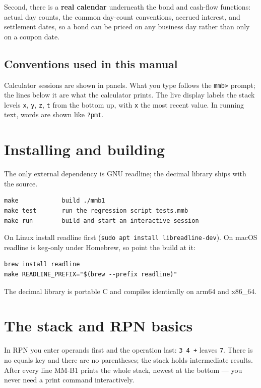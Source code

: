 \documentclass[11pt]{article}
\newcommand{\w}[1]{\texttt{#1}}
\begin{document}
Second, there is a \textbf{real calendar} underneath the bond and cash-flow
functions: actual day counts, the common day-count conventions, accrued
interest, and settlement dates, so a bond can be priced on any business day
rather than only on a coupon date.

\subsection{Conventions used in this manual}

Calculator sessions are shown in panels. What you type follows the \w{mmb>}
prompt; the lines below it are what the calculator prints. The live display
labels the stack levels \w{x}, \w{y}, \w{z}, \w{t} from the bottom up, with
\w{x} the most recent value. In running text, words are shown like \w{?pmt}.

\section{Installing and building}

The only external dependency is GNU readline; the decimal library ships with
the source.

\begin{lstlisting}
make            build ./mmb1
make test       run the regression script tests.mmb
make run        build and start an interactive session
\end{lstlisting}

On Linux install readline first (\w{sudo apt install libreadline-dev}). On
macOS readline is keg-only under Homebrew, so point the build at it:

\begin{lstlisting}
brew install readline
make READLINE_PREFIX="$(brew --prefix readline)"
\end{lstlisting}

The decimal library is portable C and compiles identically on arm64 and
x86\_64.

\section{The stack and RPN basics}

In RPN you enter operands first and the operation last: \w{3 4 +} leaves
\w{7}. There is no equals key and there are no parentheses; the stack holds
intermediate results. After every line MM-B1 prints the whole stack, newest at
the bottom --- you never need a print command interactively.
\end{document}
